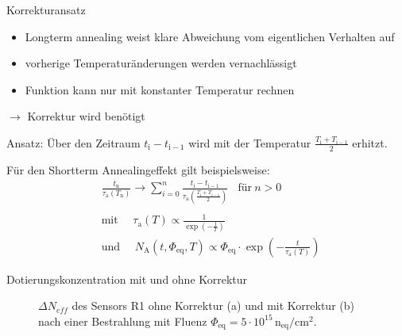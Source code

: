 \documentclass[aspectratio=43, 10pt]{beamer}
\begin{document}
\begin{frame}{Korrekturansatz}
  \begin{itemize}
    \item Longterm annealing weist klare Abweichung vom eigentlichen Verhalten auf
    \medskip
    \item vorherige Temperaturänderungen werden vernachlässigt
    \medskip
    \item Funktion kann nur mit konstanter Temperatur rechnen
  \end{itemize}
  \medskip
  $\rightarrow$ Korrektur wird benötigt
  \medskip

  Ansatz: Über den Zeitraum $t_{\mathrm{i}} - t_{\mathrm{i-1}}$ wird mit der Temperatur $\frac{T_{\mathrm{i}} +T_{\mathrm{i-1}}}{2}$ erhitzt.

  Für den Shortterm Annealingeffekt gilt beispielsweise:
  \begin{align*}
    &\frac{t_{\mathrm{n}}}{\tau_{\mathrm{a}}(T_{\mathrm{n}})} \rightarrow \sum_{i=0}^n  \frac{t_{\mathrm{i}} - t_{\mathrm{i-1}}}{\tau_{\mathrm{a}}(\frac{T_{\mathrm{i}} +T_{\mathrm{i-1}}}{2})} \:\:\:\: \text{für} \: n>0 \\
    \\
    &\text{mit} \:\:\:\:\:\: \tau_{\mathrm{a}}(T) \propto \frac{1}{\exp{\left(-\frac{1}{T}\right)}} \\
    &\text{und}  \:\:\:\:\:\: N_{\mathrm{A}}(t, \Phi_{\mathrm{eq}}, T)     \propto \Phi_{\mathrm{eq}} \cdot \exp{\left(-\frac{t}{\tau_{\mathrm{a}}(T)}\right) }
  \end{align*}
\end{frame}

\begin{frame}{Dotierungskonzentration mit und ohne Korrektur}
  \begin{figure}
  \caption{$\Delta N_{eff}$ des Sensors R1 ohne Korrektur (a) und mit Korrektur (b) nach einer Bestrahlung mit Fluenz $\Phi_{\mathrm{eq}} = 5\cdot 10^{15} \, \mathrm{n_{\mathrm{eq}}/cm^2}$.}
  \end{figure}
\end{frame}
\end{document}
